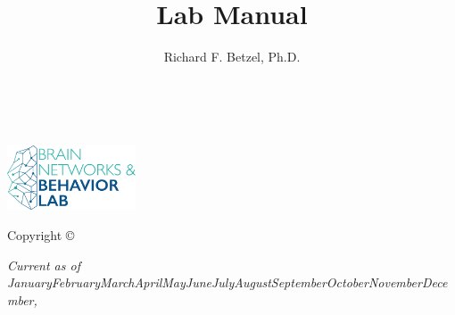 \documentclass{tufte-book} %
\title{Lab Manual} %
\author{Richard F. Betzel, Ph.D.} %
\newcommand{\monthyear}{\ifcase\month\or January\or February\or March\or April\or May\or June\or July\or August\or September\or October\or November\or December\fi,\space\number\year} %
\newcommand{\openepigraph}[2]{ %
\begin{fullwidth}
\sffamily%
\begin{doublespace}
\noindent\allcaps{#1}\\ %
\noindent\allcaps{#2} %
\end{doublespace}
\end{fullwidth}
}
\begin{document}
\frontmatter


\thispagestyle{empty}


\maketitle %

\newpage
\begin{fullwidth}
~\vfill
\thispagestyle{empty}
\setlength{\parindent}{0pt}
\setlength{\parskip}{\baselineskip}

\includegraphics[width=1.5in,left]{lab+logo/website+logo_1000dpi.png}\\\vspace{0.2in}

Copyright \copyright\ \the\year\ \thanklessauthor

\par{}

\par{}


\par\textit{Current as of \monthyear}
\end{fullwidth}


\setcounter{tocdepth}{1}
\tableofcontents %
\end{document}
